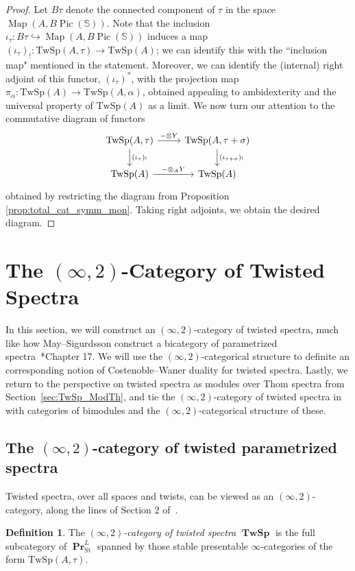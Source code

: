 \documentclass[10pt]{amsart}
\theoremstyle{plain}
\theoremstyle{definition}
\newtheorem{definition}[theorem]{Definition}
\DeclareMathOperator{\Pic}{Pic}
\DeclareMathOperator{\PPr}{\mathbf{Pr}}
\DeclareMathOperator{\TTwSp}{\mathbf{TwSp}}
\DeclareMathOperator{\Map}{Map}
\newcommand{\St}{\mathrm{St}}
\newcommand{\bS}{\mathbb{S}}
\newcommand{\TwSp}{\mathrm{TwSp}}
\begin{document}
\begin{proof}
Let $B \tau$ denote the connected component of $\tau$ in the space $\Map(A, B \Pic(\bS))$.
Note that the inclusion $\iota_{\tau} : B\tau \hookrightarrow \Map(A,B\Pic(\bS))$ induces a map $(\iota_{\tau})_{!}: \TwSp(A, \tau) \to \TwSp(A)$; we can identify this with the  ``inclusion map" mentioned in the statement.
Moreover, we can identify the (internal) right adjoint of this functor, $(\iota_{\tau})^{*}$, with the projection map $\pi_{\alpha}: \TwSp(A) \to \TwSp(A, \alpha)$, obtained appealing to ambidexterity and the universal property of $\TwSp(A)$ as a limit.
We now turn our attention to the commutative diagram of functors
 \[
  \begin{tikzcd}
    \TwSp(A,\tau) \arrow[r,"-\otimes Y"] \arrow[d, " (\iota_{\tau})_! "] & \TwSp(A , \tau + \sigma) \arrow[d, " (\iota_{\tau + \sigma})_! "] \\
  \TwSp(A) \arrow[r,"-\otimes_{A} Y"] & \TwSp(A)
  \end{tikzcd}
  \]
obtained by restricting the diagram from Proposition \ref{prop:total_cat_symm_mon}.
Taking right adjoints, we obtain the desired diagram.
\end{proof}

\section{The $(\infty, 2)$-Category of Twisted Spectra}

In this section, we will construct an $(\infty,2)$-category of twisted spectra, much like how May--Sigurdsson construct a bicategory of parametrized spectra~\cite{MS06}*{Chapter 17}.
We will use the $(\infty,2)$-categorical structure to definite an corresponding notion of Costenoble--Waner duality for twisted spectra.
Lastly, we return to the perspective on twisted spectra as modules over Thom spectra from Section~\ref{sec:TwSp_ModTh}, and tie the $(\infty,2)$-category of twisted spectra in with categories of bimodules and the $(\infty,2)$-categorical structure of these.

  \subsection{The $(\infty,2)$-category of twisted parametrized spectra}

Twisted spectra, over all spaces and twists, can be viewed as an $(\infty,2)$-category, along the lines of Section 2 of~\cite{Cno23}.

\begin{definition}
  The \emph{$(\infty,2)$-category of twisted spectra} $\TTwSp$ is the full subcategory of $\PPr^L_{\St}$ spanned by those stable presentable $\infty$-categories of the form $\TwSp(A,\tau)$.
\end{definition}
\end{document}
